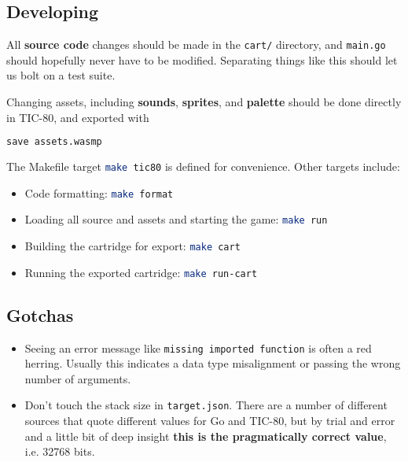 \documentclass{article}
\begin{document}
\subsection{Developing}

\noindent All \textbf{source code} changes should be made in the \lstinline|cart/| directory, and \lstinline[language=Bash]|main.go| should hopefully never have to be modified. Separating things like this should let us bolt on a test suite.

Changing assets, including \textbf{sounds}, \textbf{sprites}, and \textbf{palette} should be done directly in TIC-80, and exported with
\\
\begin{lstlisting}[language=Bash]
save assets.wasmp
\end{lstlisting}

\noindent The Makefile target \lstinline[language=Bash]|make tic80| is defined for convenience. Other targets include:

\noindent

\begin{itemize}
    \item Code formatting: \lstinline[language=Bash]|make format|
    \item Loading all source and assets and starting the game: \lstinline[language=Bash]|make run|
    \item Building the cartridge for export: \lstinline[language=Bash]|make cart|
    \item Running the exported cartridge: \lstinline[language=Bash]|make run-cart|
\end{itemize}

\subsection{Gotchas}

\begin{itemize}
    \item Seeing an error message like \lstinline|missing imported function| is often a red herring. Usually this indicates a data type misalignment or passing the wrong number of arguments.
    \item Don't touch the stack size in \lstinline|target.json|. There are a number of different sources that quote different values for Go and TIC-80, but by trial and error and a little bit of deep insight \textbf{this is the pragmatically correct value}, i.e. 32768 bits.
\end{itemize}
\end{document}
